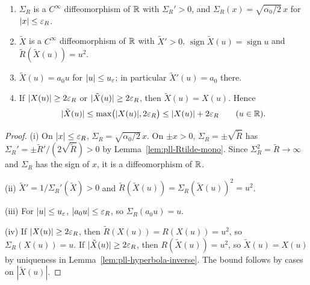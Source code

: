 \begin{lemma}\label{lem:pll-quadratic}
\begin{enumerate}[label=(\roman*)]
\item $\Sigma_R$ is a $C^\infty$ diffeomorphism of $\mathbb{R}$ with $\Sigma_R'>0$, and
 $\Sigma_R(x)=\sqrt{\alpha_0/2}\,x$ for $|x|\le\varepsilon_R$.
\item $\tilde X$ is a $C^\infty$ diffeomorphism of $\mathbb{R}$ with $\tilde X'>0$,
 $\operatorname{sign}\tilde X(u)=\operatorname{sign}u$ and $\tilde R(\tilde X(u))=u^2$.
\item $\tilde X(u)=a_0u$ for $|u|\le u_\varepsilon$; in particular $\tilde X'(u)=a_0$ there.
\item If $|X(u)|\ge2\varepsilon_R$ or $|\tilde X(u)|\ge2\varepsilon_R$, then $\tilde X(u)=X(u)$. Hence
 \[
  |\tilde X(u)|\le\max\bigl(|X(u)|,2\varepsilon_R\bigr)\le|X(u)|+2\varepsilon_R\qquad(u\in\mathbb{R}).
 \]
\end{enumerate}
\end{lemma}

\begin{proof}
(i) On $|x|\le\varepsilon_R$, $\Sigma_R=\sqrt{\alpha_0/2}\,x$. On $\pm x>0$, $\Sigma_R=\pm\sqrt{\tilde R}$ has $\Sigma_R'=\pm\tilde R'/(2\sqrt{\tilde R})>0$ by Lemma~\ref{lem:pll-Rtilde-mono}. Since $\Sigma_R^2=\tilde R\to\infty$ and $\Sigma_R$ has the sign of $x$, it is a diffeomorphism of $\mathbb{R}$.

(ii) $\tilde X'=1/\Sigma_R'(\tilde X)>0$ and $\tilde R(\tilde X(u))=\Sigma_R(\tilde X(u))^2=u^2$.

(iii) For $|u|\le u_\varepsilon$, $|a_0u|\le\varepsilon_R$, so $\Sigma_R(a_0u)=u$.

(iv) If $|X(u)|\ge2\varepsilon_R$, then $\tilde R(X(u))=R(X(u))=u^2$, so $\Sigma_R(X(u))=u$. If $|\tilde X(u)|\ge2\varepsilon_R$, then $R(\tilde X(u))=u^2$, so $\tilde X(u)=X(u)$ by uniqueness in Lemma~\ref{lem:pll-hyperbola-inverse}. The bound follows by cases on $|\tilde X(u)|$.
\end{proof}

